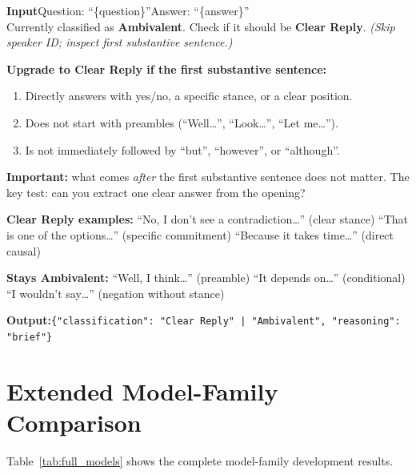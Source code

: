 \documentclass[11pt]{article}
\begin{document}
\begin{tcolorbox}[colback=passthree!5, colframe=passthree, fonttitle=\bfseries\footnotesize, title=Pass 3: Upgrade Verification, breakable, boxrule=0.4pt, arc=3pt, left=5pt, right=5pt, top=3pt, bottom=3pt, fontupper=\footnotesize, before skip=6pt, after skip=6pt, toptitle=2pt, bottomtitle=2pt]
\textbf{Input}\quad Question: ``\{question\}''\quad Answer: ``\{answer\}''\\
Currently classified as \textbf{Ambivalent}. Check if it should be \textbf{Clear Reply}.\quad
\textit{(Skip speaker ID; inspect first substantive sentence.)}\smallskip

\textbf{Upgrade to Clear Reply if the first substantive sentence:}
\begin{enumerate}[leftmargin=1.7em,topsep=1pt,itemsep=0pt]
\item Directly answers with yes/no, a specific stance, or a clear position.
\item Does not start with preambles (``Well\ldots'', ``Look\ldots'', ``Let me\ldots'').
\item Is not immediately followed by ``but'', ``however'', or ``although''.
\end{enumerate}\smallskip

\textbf{Important:} what comes \emph{after} the first substantive sentence does not matter.
The key test: can you extract one clear answer from the opening?\smallskip

\textbf{Clear Reply examples:}\quad
``No, I don't see a contradiction\ldots'' (clear stance)\quad
``That is one of the options\ldots'' (specific commitment)\quad
``Because it takes time\ldots'' (direct causal)\smallskip

\textbf{Stays Ambivalent:}\quad
``Well, I think\ldots'' (preamble)\quad
``It depends on\ldots'' (conditional)\quad
``I wouldn't say\ldots'' (negation without stance)\smallskip

\textbf{Output:}\quad \texttt{\{"classification": "Clear Reply" | "Ambivalent", "reasoning": "brief"\}}
\end{tcolorbox}

\vspace{1.5em}

\section{Extended Model-Family Comparison}
\label{app:models}

Table~\ref{tab:full_models} shows the complete model-family development results.
\end{document}

